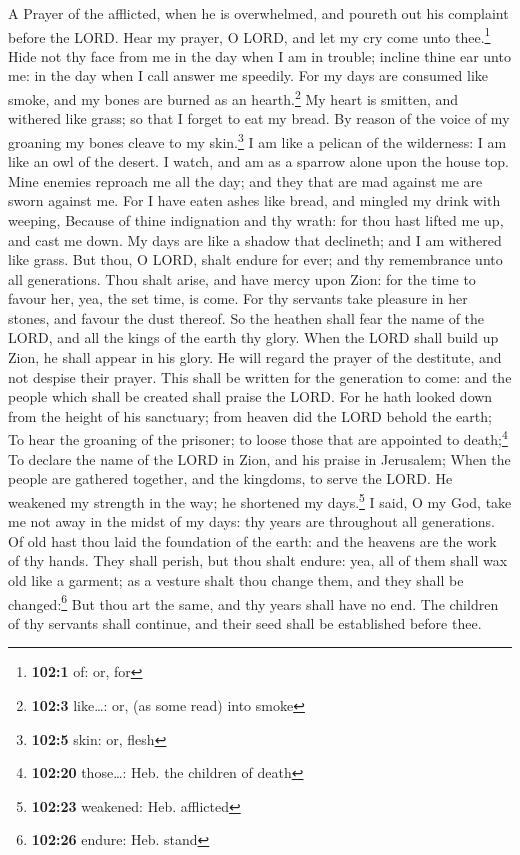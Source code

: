 A Prayer of the afflicted, when he is overwhelmed, and poureth out his
complaint before the LORD.  Hear my prayer, O LORD, and
let my cry come unto thee.\footnote{\textbf{102:1} of: or, for}
 Hide not thy face from me in the day when I am in
trouble; incline thine ear unto me: in the day when I call answer me
speedily.  For my days are consumed like smoke, and my
bones are burned as an hearth.\footnote{\textbf{102:3} like\ldots: or,
  (as some read) into smoke}  My heart is smitten, and
withered like grass; so that I forget to eat my bread.  By
reason of the voice of my groaning my bones cleave to my
skin.\footnote{\textbf{102:5} skin: or, flesh}  I am like
a pelican of the wilderness: I am like an owl of the desert.
 I watch, and am as a sparrow alone upon the house top.
 Mine enemies reproach me all the day; and they that are
mad against me are sworn against me.  For I have eaten
ashes like bread, and mingled my drink with weeping, 
Because of thine indignation and thy wrath: for thou hast lifted me up,
and cast me down.  My days are like a shadow that
declineth; and I am withered like grass.  But thou, O
LORD, shalt endure for ever; and thy remembrance unto all generations.
 Thou shalt arise, and have mercy upon Zion: for the time
to favour her, yea, the set time, is come.  For thy
servants take pleasure in her stones, and favour the dust thereof.
 So the heathen shall fear the name of the LORD, and all
the kings of the earth thy glory.  When the LORD shall
build up Zion, he shall appear in his glory.  He will
regard the prayer of the destitute, and not despise their prayer.
 This shall be written for the generation to come: and
the people which shall be created shall praise the LORD. 
For he hath looked down from the height of his sanctuary; from heaven
did the LORD behold the earth;  To hear the groaning of
the prisoner; to loose those that are appointed to death;\footnote{\textbf{102:20}
  those\ldots: Heb. the children of death}  To declare
the name of the LORD in Zion, and his praise in Jerusalem;
 When the people are gathered together, and the kingdoms,
to serve the LORD.  He weakened my strength in the way;
he shortened my days.\footnote{\textbf{102:23} weakened: Heb. afflicted}
 I said, O my God, take me not away in the midst of my
days: thy years are throughout all generations.  Of old
hast thou laid the foundation of the earth: and the heavens are the work
of thy hands.  They shall perish, but thou shalt endure:
yea, all of them shall wax old like a garment; as a vesture shalt thou
change them, and they shall be changed:\footnote{\textbf{102:26} endure:
  Heb. stand}  But thou art the same, and thy years shall
have no end.  The children of thy servants shall
continue, and their seed shall be established before thee.

